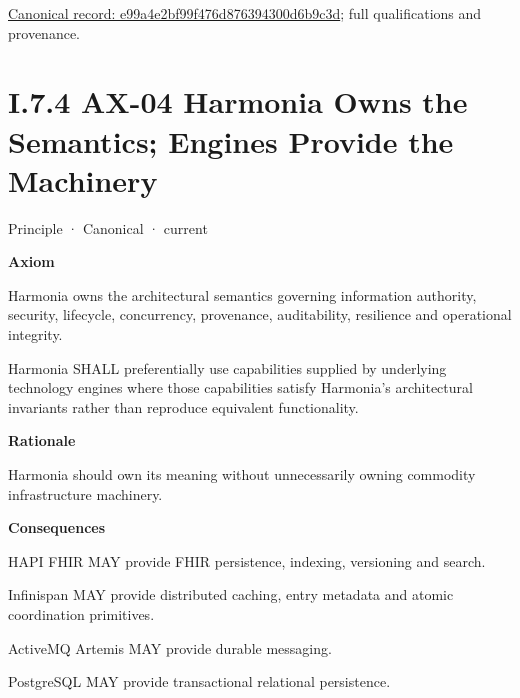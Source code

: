 {\footnotesize \href{../../../../continuum/motivation/principle/e99a4e2bf99f476d876394300d6b9c3d.md}{Canonical record: e99a4e2bf99f476d876394300d6b9c3d}; full qualifications and provenance.}\par
\section*{I.7.4 AX-04 Harmonia Owns the Semantics; Engines Provide the Machinery}
\label{navigation:I.7.4}

\label{element:54508cda80484a6caf95b901780eaf7d}
{\small Principle · Canonical · current}\par

\par\medskip\textbf{Axiom}\par


Harmonia owns the architectural semantics governing information
authority, security, lifecycle, concurrency, provenance, auditability,
resilience and operational integrity.



Harmonia SHALL preferentially use capabilities supplied by underlying
technology engines where those capabilities satisfy Harmonia's
architectural invariants rather than reproduce equivalent functionality.



\par\medskip\textbf{Rationale}\par


Harmonia should own its meaning without unnecessarily owning commodity
infrastructure machinery.



\par\medskip\textbf{Consequences}\par


HAPI FHIR MAY provide FHIR persistence, indexing, versioning and search.



Infinispan MAY provide distributed caching, entry metadata and atomic
coordination primitives.



ActiveMQ Artemis MAY provide durable messaging.



PostgreSQL MAY provide transactional relational persistence.



